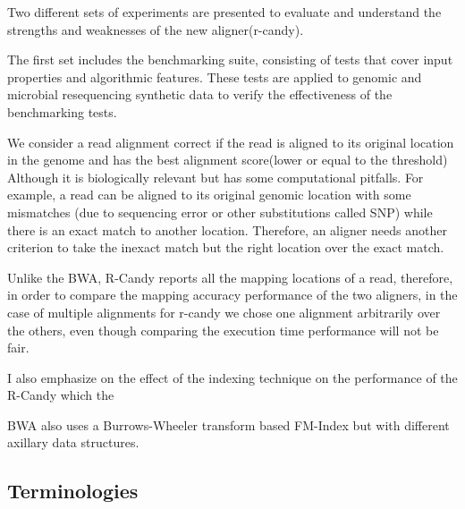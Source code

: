 \documentclass[11pt,a4paper]{report}
\begin{document}


Two different sets of experiments are presented to evaluate and understand the strengths and weaknesses of the new aligner(r-candy).

The first set includes the benchmarking suite, consisting of tests that cover input properties and algorithmic features. These tests are applied to genomic and microbial resequencing synthetic data to verify the effectiveness of the benchmarking tests. 

We consider a read alignment correct if the read is aligned to its original location in the genome and has the best alignment score(lower or equal to the threshold)
Although it is biologically relevant but has some computational pitfalls. For example, a read can be aligned to its original genomic location with some mismatches (due to sequencing error or other substitutions called SNP) while there is an exact match to another location. Therefore, an aligner needs another criterion to take the inexact match but the right location over the exact match. 

Unlike the BWA,  R-Candy reports all the mapping locations of a read, therefore,  
in order to compare the mapping accuracy performance of the two aligners, in the case of multiple alignments for r-candy we chose one alignment arbitrarily over the others, even though comparing the execution time performance will not be fair.  

I also emphasize on the effect of the indexing technique on the performance of the R-Candy which the

BWA also uses a Burrows-Wheeler transform based FM-Index but with different axillary data structures.



\subsection{Terminologies}
\end{document}
